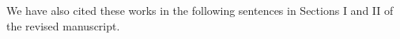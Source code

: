 \documentclass[12pt,draftclsnofoot,onecolumn]{IEEEtran}
\newcommand{\rev}[1]{{\color{blue}#1}} %
\newcommand{\rev}[1]{#1}
\newenvironment{my}[2]%
{\begin{list}{}%
{\setlength{\rightmargin}{#1}\setlength{\leftmargin}{#2}}%


 \item[]{}

} {\end{list}}
\begin{document}
\begin{enumerate}



	We have also cited these works in the following sentences in Sections I and II of the revised manuscript.
\begin{my}{1cm}{1cm}
		\rev{
			{ \color{black}
	
}}
\end{my}
\end{enumerate}
\end{document}
